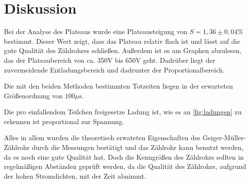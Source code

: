 \documentclass[titlepage = firstcover]{scrartcl}
\begin{document}
    \newpage
    \section{Diskussion}
      Bei der Analyse des Plateaus wurde eine Plateausteigung von $S = 1,36 \pm 0,04 \%$ bestimmt. Dieser Wert zeigt, dass das Plateau relativ flach ist und lässt auf die gute Qualität des Zählrohres schließen. Außerdem ist es am Graphen abzulesen, das der Plateaubereich von ca. 350V bis 650V geht. Dadrüber liegt der zuvermeidende Entladungsbereich und dadrunter der Proportionalbereich.

      Die mit den beiden Methoden bestimmten Totzeiten liegen in der erwarteten Größenordnung von $100 \mu$s.

      Die pro einfallendem Teilchen freigesetze Ladung ist, wie es an \autoref{fig:ladungen} zu erkennen ist proportional zur Spannung.

      Alles in allem wurden die theoretisch erwateten Eigenschaften des Geiger-Müller-Zählrohr durch die Messungen bestätigt und das Zählrohr kann benutzt werden, da es noch eine gute Qualität hat. Doch die Kenngrößen des Zählrohrs sollten in regelmäßigen Abständen geprüft werden, da die Qualität des Zählrohrs, aufgrund der hohen Stromdichten, mit der Zeit abnimmt.

          
    \newpage
\end{document}
